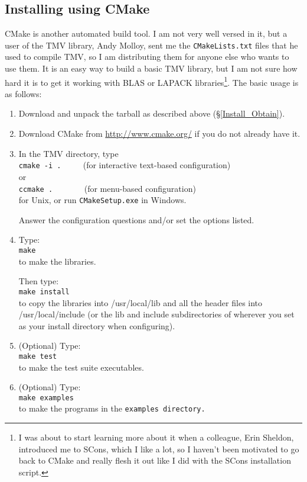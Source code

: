 \subsection{Installing using CMake}
\label{Install_CMake}

CMake is another automated build tool.  I am not very well versed in it, but a user of the 
TMV library, Andy Molloy, sent me the \texttt{CMakeLists.txt} files that he used to compile TMV,
so I am distributing them for anyone else who wants
to use them.  It is an easy way to build a basic TMV library, but I am not sure how hard it is
to get it working with BLAS or LAPACK libraries\footnote{
I was about to start learning more about it when a colleague, Erin Sheldon, introduced me to
SCons, which I like a lot, so I haven't been motivated to go back to CMake and really flesh
it out like I did with the SCons installation script.}.
The basic usage is as follows:

\begin{enumerate}
\item Download and unpack the tarball as described above (\S\ref{Install_Obtain}).

\item
Download CMake from \url{http://www.cmake.org/} if you do not already have it.

\item
In the TMV directory, type\\
\texttt{cmake -i .} $\qquad$ (for interactive text-based configuration) \\
or\\
\texttt{ccmake .} $\qquad \quad \,$ (for menu-based configuration) \\
for Unix, or run \texttt{CMakeSetup.exe} in Windows.

Answer the configuration questions and/or set the options listed.

\item
Type:\\
\texttt{make}\\
to make the libraries.

Then type:\\
\texttt{make install}\\
to copy the libraries into /usr/local/lib and all the header files into
/usr/local/include (or the lib and include subdirectories of wherever
you set as your install directory when configuring).

\item
(Optional) Type:\\
\texttt{make test}\\
to make the test suite executables.

\item
(Optional) Type:\\
\texttt{make examples}\\
to make the programs in the \tt{examples} directory.

\end{enumerate}

